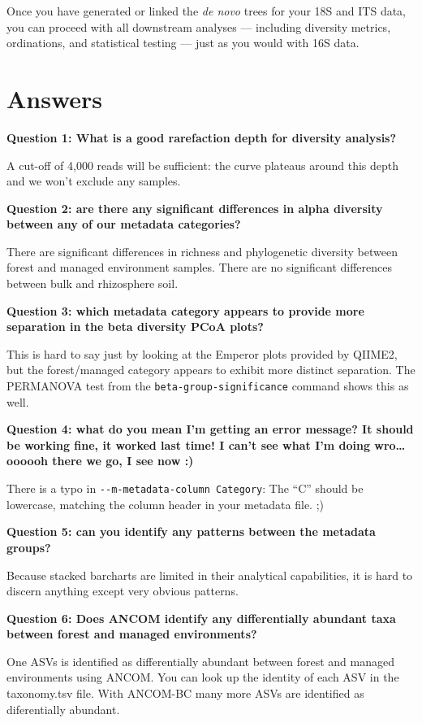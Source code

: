 \documentclass[
]{book}
\begin{document}
Once you have generated or linked the \emph{de novo} trees for your 18S and ITS data, you can proceed with all downstream analyses --- including diversity metrics, ordinations, and statistical testing --- just as you would with 16S data.

\section{Answers}\label{answers-1}

\textbf{Question 1: What is a good rarefaction depth for diversity analysis?}

A cut-off of 4,000 reads will be sufficient: the curve plateaus around this depth and we won't exclude any samples.

\textbf{Question 2: are there any significant differences in alpha diversity between any of our metadata categories?}

There are significant differences in richness and phylogenetic diversity between forest and managed environment samples. There are no significant differences between bulk and rhizosphere soil.

\textbf{Question 3: which metadata category appears to provide more separation in the beta diversity PCoA plots?}

This is hard to say just by looking at the Emperor plots provided by QIIME2, but the forest/managed category appears to exhibit more distinct separation. The PERMANOVA test from the \texttt{beta-group-significance} command shows this as well.

\textbf{Question 4: what do you mean I'm getting an error message? It should be working fine, it worked last time! I can't see what I'm doing wro\ldots{} oooooh there we go, I see now :)}

There is a typo in \texttt{-\/-m-metadata-column\ Category}: The ``C'' should be lowercase, matching the column header in your metadata file. ;)

\textbf{Question 5: can you identify any patterns between the metadata groups?}

Because stacked barcharts are limited in their analytical capabilities, it is hard to discern anything except very obvious patterns.

\textbf{Question 6: Does ANCOM identify any differentially abundant taxa between forest and managed environments?}

One ASVs is identified as differentially abundant between forest and managed environments using ANCOM. You can look up the identity of each ASV in the taxonomy.tsv file. With ANCOM-BC many more ASVs are identified as diferentially abundant.
\end{document}
